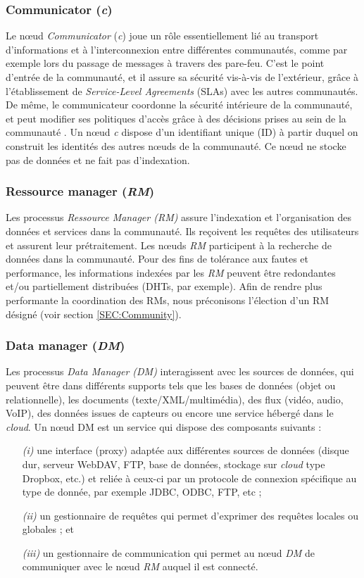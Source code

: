 \subsubsection*{Communicator (\textit{c})}
Le n{\oe}ud \textit{Communicator} (\textit{c}) joue un rôle essentiellement lié au transport d'informations et à l'interconnexion entre différentes communautés, comme par exemple lors du passage de messages à travers des pare-feu. C'est le point d'entrée de la communauté, et il assure sa sécurité vis-à-vis de l'extérieur, grâce à l'établissement de \textit{Service-Level Agreements} (SLAs) avec les autres communautés. De même, le communicateur coordonne la sécurité intérieure de la communauté, et peut modifier ses politiques d'accès grâce à des décisions prises au sein de la communauté \cite{Steffenel12a}. Un n{\oe}ud \textit{c} dispose d'un identifiant unique (ID) à partir duquel on construit les identités des autres n{\oe}uds de la communauté. Ce n{\oe}ud ne stocke pas de données et ne fait pas d'indexation.

\subsubsection*{Ressource manager (\textit{RM})} 
Les processus \textit{Ressource Manager (\textit{RM})} assure l'indexation et l'organisation des données et services dans la communauté. Ils reçoivent les requêtes des utilisateurs et assurent leur prétraitement. Les n{\oe}uds \textit{RM} participent à la recherche de données dans la communauté. Pour des fins de tolérance aux fautes et performance, les informations indexées par les \textit{RM} peuvent être redondantes et/ou partiellement distribuées (DHTs, par exemple). Afin de rendre plus performante la coordination des RMs, nous préconisons l'élection d'un RM désigné (voir section \ref{SEC:Community}).

\subsubsection*{Data manager (\textit{DM})} 
Les processus \textit{Data Manager (\textit{DM})} interagissent avec les sources de données, qui peuvent être dans différents supports tels que les bases de données (objet ou relationnelle), les documents (texte/XML/multimédia), des flux (vidéo, audio, VoIP), des données issues de capteurs ou encore une service hébergé dans le \textit{cloud}. 
Un n{\oe}ud DM est un service qui dispose des composants suivants : 
\begin{enumerate}
	\item[\textit{(i)}] une interface (proxy) adaptée aux différentes sources de données (disque dur, serveur WebDAV, FTP, base de données, stockage sur \textit{cloud} type Dropbox, etc.) et reliée à ceux-ci par un protocole de connexion spécifique au type de donnée, par exemple JDBC, ODBC, FTP, etc ;
	\item[\textit{(ii)}] un gestionnaire de requêtes qui permet d'exprimer des requêtes locales ou globales ; et 
	\item[\textit{(iii)}] un gestionnaire de communication qui permet au n{\oe}ud \textit{DM} de communiquer avec le n{\oe}ud \textit{RM} auquel il est connecté. 
\end{enumerate}

